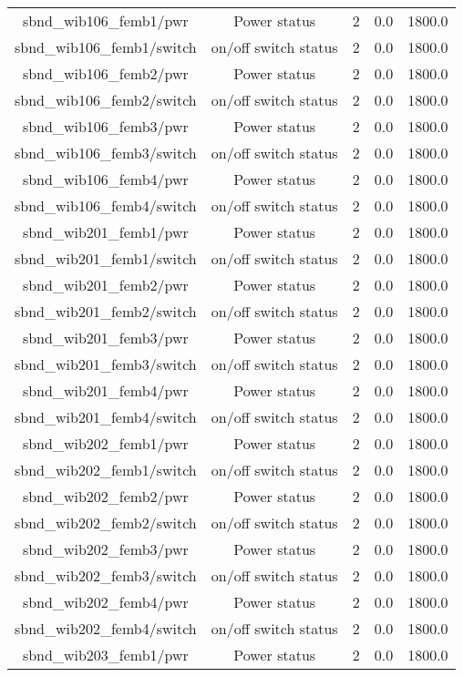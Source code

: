 \begin{center}
\begin{longtable}{c | c c c c }
sbnd\_wib106\_femb1/pwr & Power status & 2 & 0.0 & 1800.0\\ 
sbnd\_wib106\_femb1/switch & on/off switch status & 2 & 0.0 & 1800.0\\ 
sbnd\_wib106\_femb2/pwr & Power status & 2 & 0.0 & 1800.0\\ 
sbnd\_wib106\_femb2/switch & on/off switch status & 2 & 0.0 & 1800.0\\ 
sbnd\_wib106\_femb3/pwr & Power status & 2 & 0.0 & 1800.0\\ 
sbnd\_wib106\_femb3/switch & on/off switch status & 2 & 0.0 & 1800.0\\ 
sbnd\_wib106\_femb4/pwr & Power status & 2 & 0.0 & 1800.0\\ 
sbnd\_wib106\_femb4/switch & on/off switch status & 2 & 0.0 & 1800.0\\ 
sbnd\_wib201\_femb1/pwr & Power status & 2 & 0.0 & 1800.0\\ 
sbnd\_wib201\_femb1/switch & on/off switch status & 2 & 0.0 & 1800.0\\ 
sbnd\_wib201\_femb2/pwr & Power status & 2 & 0.0 & 1800.0\\ 
sbnd\_wib201\_femb2/switch & on/off switch status & 2 & 0.0 & 1800.0\\ 
sbnd\_wib201\_femb3/pwr & Power status & 2 & 0.0 & 1800.0\\ 
sbnd\_wib201\_femb3/switch & on/off switch status & 2 & 0.0 & 1800.0\\ 
sbnd\_wib201\_femb4/pwr & Power status & 2 & 0.0 & 1800.0\\ 
sbnd\_wib201\_femb4/switch & on/off switch status & 2 & 0.0 & 1800.0\\ 
sbnd\_wib202\_femb1/pwr & Power status & 2 & 0.0 & 1800.0\\ 
sbnd\_wib202\_femb1/switch & on/off switch status & 2 & 0.0 & 1800.0\\ 
sbnd\_wib202\_femb2/pwr & Power status & 2 & 0.0 & 1800.0\\ 
sbnd\_wib202\_femb2/switch & on/off switch status & 2 & 0.0 & 1800.0\\ 
sbnd\_wib202\_femb3/pwr & Power status & 2 & 0.0 & 1800.0\\ 
sbnd\_wib202\_femb3/switch & on/off switch status & 2 & 0.0 & 1800.0\\ 
sbnd\_wib202\_femb4/pwr & Power status & 2 & 0.0 & 1800.0\\ 
sbnd\_wib202\_femb4/switch & on/off switch status & 2 & 0.0 & 1800.0\\ 
sbnd\_wib203\_femb1/pwr & Power status & 2 & 0.0 & 1800.0\\ 

\end{longtable}
\end{center}
